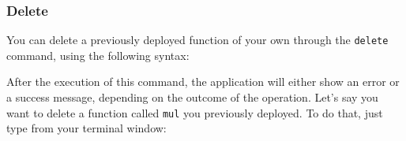 \subsubsection{Delete}
You can delete a previously deployed function of your own through the \texttt{delete} command, using the following syntax:
\begin{center}
\end{center}
After the execution of this command, the application will either show an error or a success message, depending on the outcome of the operation.
Let's say you want to delete a function called \texttt{mul} you previously deployed. To do that, just type from your terminal window:
\begin{center}
\end{center}